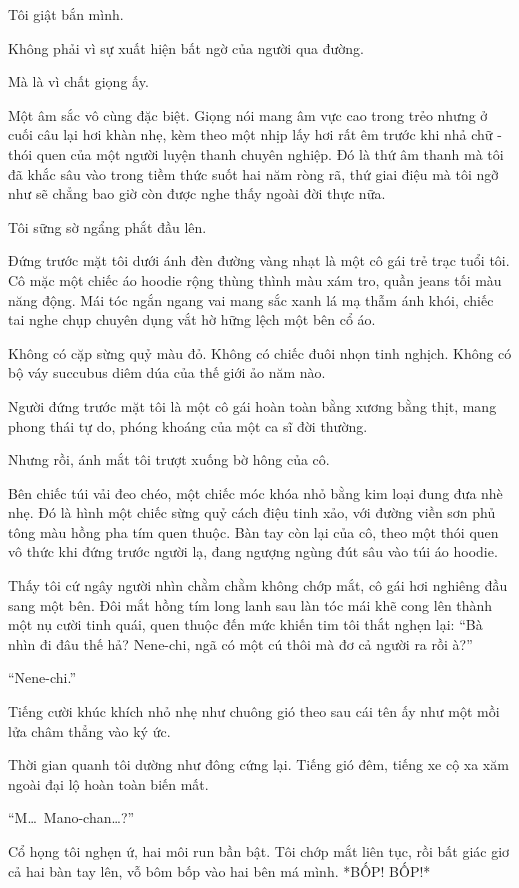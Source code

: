 \documentclass[../main.tex]{subfiles}
\begin{document}
Tôi giật bắn mình.

Không phải vì sự xuất hiện bất ngờ của người qua đường.

Mà là vì chất giọng ấy.

Một âm sắc vô cùng đặc biệt. Giọng nói mang âm vực cao trong trẻo nhưng ở cuối câu lại hơi khàn nhẹ, kèm theo một nhịp lấy hơi rất êm trước khi nhả chữ - thói quen của một người luyện thanh chuyên nghiệp. Đó là thứ âm thanh mà tôi đã khắc sâu vào trong tiềm thức suốt hai năm ròng rã, thứ giai điệu mà tôi ngỡ như sẽ chẳng bao giờ còn được nghe thấy ngoài đời thực nữa.

Tôi sững sờ ngẩng phắt đầu lên.

Đứng trước mặt tôi dưới ánh đèn đường vàng nhạt là một cô gái trẻ trạc tuổi tôi. Cô mặc một chiếc áo hoodie rộng thùng thình màu xám tro, quần jeans tối màu năng động. Mái tóc ngắn ngang vai mang sắc xanh lá mạ thẫm ánh khói, chiếc tai nghe chụp chuyên dụng vắt hờ hững lệch một bên cổ áo.

Không có cặp sừng quỷ màu đỏ. Không có chiếc đuôi nhọn tinh nghịch. Không có bộ váy succubus diêm dúa của thế giới ảo năm nào.

Người đứng trước mặt tôi là một cô gái hoàn toàn bằng xương bằng thịt, mang phong thái tự do, phóng khoáng của một ca sĩ đời thường.

Nhưng rồi, ánh mắt tôi trượt xuống bờ hông của cô.

Bên chiếc túi vải đeo chéo, một chiếc móc khóa nhỏ bằng kim loại đung đưa nhè nhẹ. Đó là hình một chiếc sừng quỷ cách điệu tinh xảo, với đường viền sơn phủ tông màu hồng pha tím quen thuộc. Bàn tay còn lại của cô, theo một thói quen vô thức khi đứng trước người lạ, đang ngượng ngùng đút sâu vào túi áo hoodie.

Thấy tôi cứ ngây người nhìn chằm chằm không chớp mắt, cô gái hơi nghiêng đầu sang một bên. Đôi mắt hồng tím long lanh sau làn tóc mái khẽ cong lên thành một nụ cười tinh quái, quen thuộc đến mức khiến tim tôi thắt nghẹn lại: ``Bà nhìn đi đâu thế hả? Nene-chi, ngã có một cú thôi mà đơ cả người ra rồi à?''

``Nene-chi.''

Tiếng cười khúc khích nhỏ nhẹ như chuông gió theo sau cái tên ấy như một mồi lửa châm thẳng vào ký ức.

Thời gian quanh tôi dường như đông cứng lại. Tiếng gió đêm, tiếng xe cộ xa xăm ngoài đại lộ hoàn toàn biến mất.

``M\dots\ Mano-chan\dots?''

Cổ họng tôi nghẹn ứ, hai môi run bần bật. Tôi chớp mắt liên tục, rồi bất giác giơ cả hai bàn tay lên, vỗ bôm bốp vào hai bên má mình. *BỐP! BỐP!*
\end{document}
